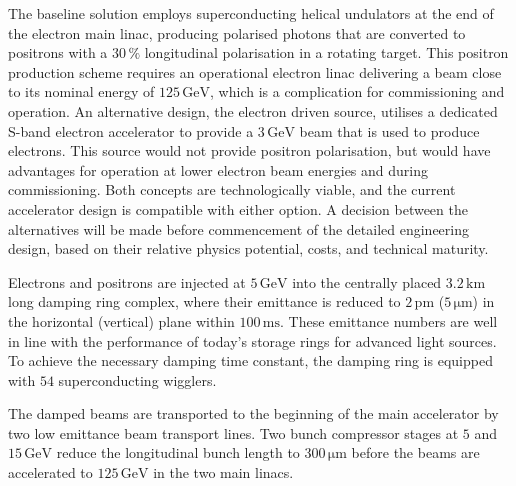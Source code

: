 \documentclass[%
 reprint,
 amsmath,amssymb,
 aps,
]{revtex4-1}
\begin{document}
The baseline solution employs superconducting helical undulators at the end of the electron main linac, producing polarised photons that are converted to positrons with a $30\,\%$ longitudinal polarisation in a rotating target.
This positron production scheme requires an operational electron linac delivering a beam close to its nominal energy of $125\,{\mathrm{GeV}}$, which is a complication for commissioning and operation. 
An alternative design, the electron driven source, utilises a dedicated S-band electron accelerator to provide a $3\,{\mathrm{GeV}}$ beam that is used to produce electrons.
This source would not provide positron polarisation,
but would have advantages for operation at lower electron beam energies and during commissioning.
Both concepts are technologically viable, and the current accelerator design is compatible with either option. 
A decision between the alternatives will be made before commencement of the detailed engineering design, based on their relative physics potential, costs, and technical maturity.

Electrons and positrons are injected at $5\,{\mathrm{GeV}}$ into the centrally placed $3.2\,{\mathrm{km}}$ long damping ring complex, where their emittance is reduced to $2\,{\mathrm{pm}}$ ($5\,{\mathrm{\mu m}}$) in the horizontal (vertical) plane within $100\,{\mathrm{ms}}$. 
These emittance numbers are well in line with the performance of today's storage rings for advanced light sources.
To achieve the necessary damping time constant, the damping ring is equipped with $54$ superconducting wigglers. 

The damped beams are transported to the beginning of the main accelerator by two low emittance beam transport lines. Two bunch compressor stages at $5$ and $15\,{\mathrm{GeV}}$ reduce the longitudinal bunch length to $300\,{\mathrm{\mu m}}$ before the beams are accelerated to $125\,{\mathrm{GeV}}$ in the two main linacs.
\end{document}
